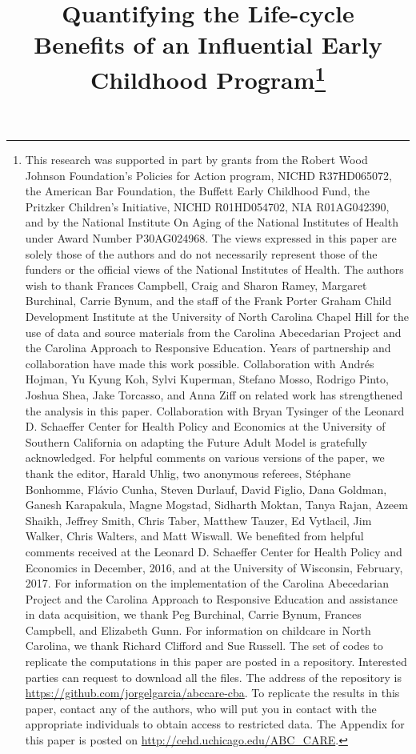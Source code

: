 \begin{titlepage}
\title{\Large \textbf{Quantifying the Life-cycle \\ Benefits of an Influential Early Childhood Program}\thanks{This research was supported in part by grants from the Robert Wood Johnson Foundation's Policies for Action program, NICHD R37HD065072, the American Bar Foundation, the Buffett Early Childhood Fund, the Pritzker Children's Initiative, NICHD R01HD054702, NIA R01AG042390, and by the National Institute On Aging of the National Institutes of Health under Award Number P30AG024968. The views expressed in this paper are solely those of the authors and do not necessarily represent those of the funders or the official views of the National Institutes of Health. The authors wish to thank Frances Campbell, Craig and Sharon Ramey, Margaret Burchinal, Carrie Bynum, and the staff of the Frank Porter Graham Child Development Institute at the University of North Carolina Chapel Hill for the use of data and source materials from the Carolina Abecedarian Project and the Carolina Approach to Responsive Education. Years of partnership and collaboration have made this work possible. Collaboration with Andr\'{e}s Hojman, Yu Kyung Koh, Sylvi Kuperman, Stefano Mosso, Rodrigo Pinto, Joshua Shea, Jake Torcasso, and Anna Ziff on related work has strengthened the analysis in this paper. Collaboration with Bryan Tysinger of the Leonard D. Schaeffer Center for Health Policy and Economics at the University of Southern California on adapting the Future Adult Model is gratefully acknowledged. For helpful comments on various versions of the paper, we thank the editor, Harald Uhlig, two anonymous referees, St\'{e}phane Bonhomme, Fl\'{a}vio Cunha, Steven Durlauf, David Figlio, Dana Goldman, Ganesh Karapakula, Magne Mogstad, Sidharth Moktan, Tanya Rajan, Azeem Shaikh, Jeffrey Smith, Chris Taber, Matthew Tauzer, Ed Vytlacil, Jim Walker, Chris Walters, and Matt Wiswall. We benefited from helpful comments received at the Leonard D. Schaeffer Center for Health Policy and Economics in December, 2016, and at the University of Wisconsin, February, 2017. For information on the implementation of the Carolina Abecedarian Project and the Carolina Approach to Responsive Education and assistance in data acquisition, we thank Peg Burchinal, Carrie Bynum, Frances Campbell, and Elizabeth Gunn. For information on childcare in North Carolina, we thank Richard Clifford and Sue Russell. The set of codes to replicate the computations in this paper are posted in a repository. Interested parties can request to download all the files. The address of the repository is \url{https://github.com/jorgelgarcia/abccare-cba}. To replicate the results in this paper, contact any of the authors, who will put you in contact with the appropriate individuals to obtain access to restricted data. The Appendix for this paper is posted on \url{http://cehd.uchicago.edu/ABC_CARE}.}}


\end{titlepage}
